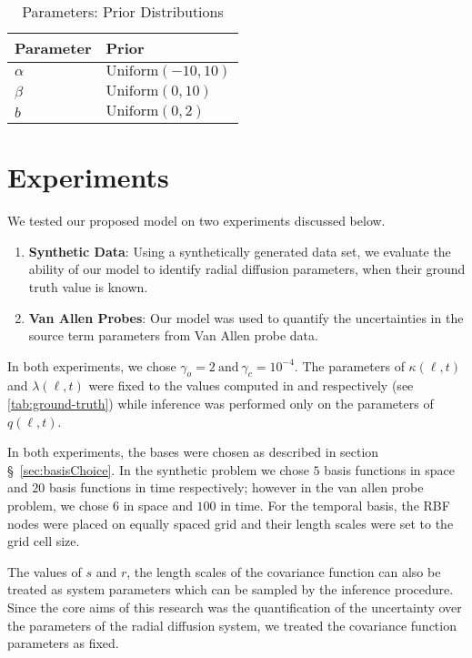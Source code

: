 \begin{table}[ht]
  \caption{Parameters: Prior Distributions}
  \label{tab:prior}
  \centering
  \begin{tabular}{ll}
    \hline
    \textbf{Parameter} & \textbf{Prior}\\
    \hline
    $\alpha$ & $\text{Uniform}(-10, 10)$ \\
    $\beta$  & $\text{Uniform}(0, 10)$ \\ 
    $b$ & $\text{Uniform}(0, 2)$ \\
    \hline
  \end{tabular}
\end{table}


\section{Experiments}\label{sec:exp}

We tested our proposed model on two experiments discussed below.
%
\begin{enumerate}
  \item \textbf{Synthetic Data}: Using a synthetically generated data set, we evaluate the ability 
        of our model to identify radial diffusion parameters, when their ground truth value is 
        known.
  \item \textbf{Van Allen Probes}: Our model was used to quantify the uncertainties in the 
        source term parameters from Van Allen probe data. 
\end{enumerate}

In both experiments, we chose $\gamma_o = 2 \ \text{and} \ \gamma_c = 10^{-4}$. The parameters of 
$\kappa(\ell, t)$ and $\lambda(\ell, t)$ were fixed to the values computed in 
\citet{JGRA:JGRA15067} and \citet{GRL:GRL22815} respectively (see \cref{tab:ground-truth}) while 
inference was performed only on the parameters of $q(\ell, t)$. 

In both experiments, the bases were chosen as described in section \S~\ref{sec:basisChoice}. In the 
synthetic problem we chose $5$ basis functions in space and $20$ basis functions in time 
respectively; however in the van allen probe problem, we chose $6$ in space and $100$ in time. 
For the temporal basis, the RBF nodes were placed on equally spaced grid and their length scales 
were set to the grid cell size. 

The values of $s$ and $r$, the length scales of the covariance function can also be treated as 
system parameters which can be sampled by the inference procedure. Since the core aims of this 
research was the quantification of the uncertainty over the parameters of the radial diffusion 
system, we treated the covariance function parameters as fixed.


